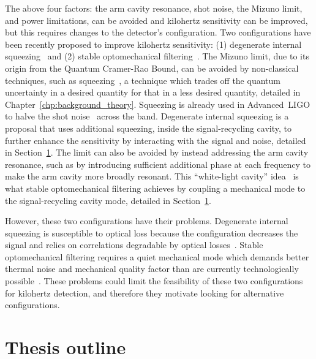 The above four factors: the arm cavity resonance, shot noise, the Mizuno limit, and power limitations, can be avoided and kilohertz sensitivity can be improved, but this requires changes to the detector's configuration. Two configurations have been recently proposed to improve kilohertz sensitivity: (1) degenerate internal squeezing~\cite{Korobko2019,Adya2020} and (2) stable optomechanical filtering~\cite{Li2020,Miao2015}. 
The Mizuno limit, due to its origin from the Quantum Cramer-Rao Bound, can be avoided by non-classical techniques, such as squeezing~\cite{}, a technique which trades off the quantum uncertainty in a desired quantity for that in a less desired quantity, detailed in Chapter~\ref{chp:background_theory}. Squeezing is already used in Advanced~LIGO to halve the shot noise~\cite{tseQuantumEnhancedAdvancedLIGO2019} across the band. Degenerate internal squeezing is a proposal that uses additional squeezing, inside the signal-recycling cavity, to further enhance the sensitivity by interacting with the signal and noise, detailed in Section~\ref{}. 
The limit can also be avoided by instead addressing the arm cavity resonance, such as by introducing sufficient additional phase at each frequency to make the arm cavity more broadly resonant. This ``white-light cavity'' idea~\cite{Miao2015,} is what stable optomechanical filtering achieves by coupling a mechanical mode to the signal-recycling cavity mode, detailed in Section~\ref{}.

However, these two configurations have their problems. Degenerate internal squeezing is susceptible to optical loss because the configuration decreases the signal and relies on correlations degradable by optical losses~\cite{Korobko2019}. Stable optomechanical filtering requires a quiet mechanical mode which demands better thermal noise and mechanical quality factor than are currently technologically possible~\cite{Li2020,Miao2015}. These problems could limit the feasibility of these two configurations for kilohertz detection, and therefore they motivate looking for alternative configurations. %


\section{Thesis outline}

